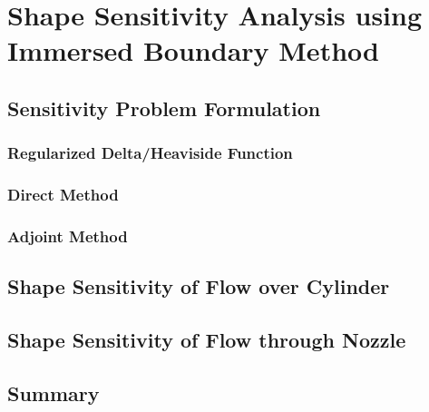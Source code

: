 \chapter{Shape Sensitivity Analysis using Immersed Boundary Method}

\section{Sensitivity Problem Formulation}
\lipsum[2-7]
\subsection{Regularized Delta/Heaviside Function}
\lipsum[2-22]
\subsection{Direct Method}
\lipsum[2-15]
\subsection{Adjoint Method}
\lipsum[2-10]
\section{Shape Sensitivity of Flow over Cylinder}
\lipsum[2-34]
\section{Shape Sensitivity of Flow through Nozzle}
\lipsum[2-28]
\section{Summary}
\lipsum[2-5]